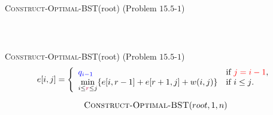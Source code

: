 
\begin{frame}
  \begin{exampleblock}{\textsc{Construct-Optimal-BST}(root) (Problem $15.5$-$1$)}
    \begin{columns}
    \end{columns}
  \end{exampleblock}

  \pause
  \vspace{0.30cm}
  \begin{center}
     \\[6pt]
  \end{center}
\end{frame}

\begin{frame}
  \begin{exampleblock}{\textsc{Construct-Optimal-BST}(root) (Problem $15.5$-$1$)}
    \[ 
      e[i,j] = \left\{ \begin{array}{ll}
	\textcolor{blue}{q_{i-1}} 	& \mbox{if \textcolor{red}{$j = i-1$}}, \\
	\min\limits_{i \le \textcolor{purple}{r} \le j} \{e[i, r-1] + e[r+1, j] + w(i,j) \}    & \mbox{if $i \le j$}.
      \end{array} \right. 
    \] 
  \end{exampleblock}

  \pause
  

  \pause
  \vspace{-0.50cm}
  \[
    \textsc{Construct-Optimal-BST}(root, 1, n)
  \]
\end{frame}

\begin{frame}
\end{frame}

\begin{frame}
  
\end{frame}
